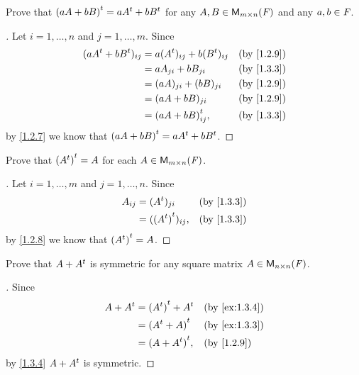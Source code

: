 \exercisesection

\setcounter{ex}{2}
\begin{ex}\label{ex:1.3.3}
	Prove that \({(aA + bB)}^{t} = a{A}^{t} + b{B}^{t}\) for any \(A, B \in \ms[m][n][\F]\) and any \(a, b \in \mathit{F}\).
\end{ex}

\begin{proof}[]
	Let \(i = 1, \dots, n\) and \(j = 1, \dots, m\).
	Since
	\begin{align*}
		(a\tp{A} + b\tp{B})_{i j} & = a(\tp{A})_{i j} + b(\tp{B})_{i j} &  & \by{1.2.9} \\
		                          & = aA_{j i} + bB_{j i}               &  & \by{1.3.3} \\
		                          & = (aA)_{j i} + (bB)_{j i}           &  & \by{1.2.9} \\
		                          & = (aA + bB)_{j i}                   &  & \by{1.2.9} \\
		                          & = \tp{(aA + bB)}_{i j},             &  & \by{1.3.3}
	\end{align*}
	by \cref{1.2.7} we know that \({(aA + bB)}^{t} = a{A}^{t} + b{B}^{t}\).
\end{proof}

\begin{ex}\label{ex:1.3.4}
	Prove that \({({A}^{t})}^{t} = A\) for each \(A \in \ms\).
\end{ex}

\begin{proof}[]
	Let \(i = 1, \dots, m\) and \(j = 1, \dots, n\).
	Since
	\begin{align*}
		A_{i j} & = (\tp{A})_{j i}         &  & \by{1.3.3} \\
		        & = (\tp{(\tp{A})})_{i j}, &  & \by{1.3.3}
	\end{align*}
	by \cref{1.2.8} we know that \({({A}^{t})}^{t} = A\).
\end{proof}

\begin{ex}\label{ex:1.3.5}
	Prove that \(A + {A}^{t}\) is symmetric for any square matrix \(A \in \ms[n][n][\F]\).
\end{ex}

\begin{proof}[]
	Since
	\begin{align*}
		A + \tp{A} & = \tp{(\tp{A})} + \tp{A} &  & \by{ex:1.3.4} \\
		           & = \tp{(\tp{A} + A)}      &  & \by{ex:1.3.3} \\
		           & = \tp{(A + \tp{A})},     &  & \by{1.2.9}
	\end{align*}
	by \cref{1.3.4} \(A + {A}^{t}\) is symmetric.
\end{proof}

